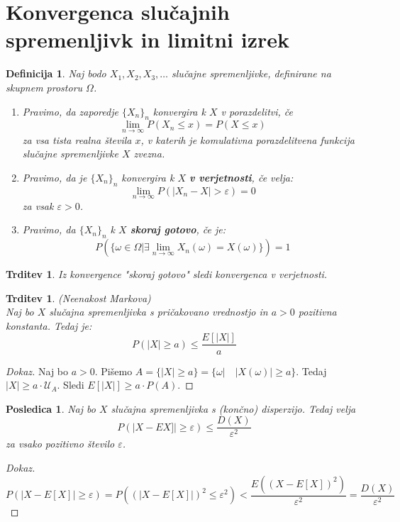 \documentclass[11pt]{article}
\newtheorem{Trditev}[Izrek]{{\sc Trditev}}
\newtheorem{Posledica}[Izrek]{{\sc Posledica}}
\newtheorem{Definicija}[Izrek]{{\sc Definicija}}
\newenvironment{dokaz}[1][{\sc Dokaz}]{\begin{proof}[#1]\renewcommand*{\qedsymbol}{\(\blacksquare\)}}{\end{proof}}
\begin{document}
	\section{Konvergenca slučajnih spremenljivk in limitni izrek}
	\begin{Definicija}
		Naj bodo $X_1,X_2,X_3,\ldots $ slučajne spremenljivke, definirane na skupnem prostoru $\Omega$.
		\begin{enumerate}
			\item
			Pravimo, da zaporedje $\{X_n\}_n$ konvergira k $X$ v porazdelitvi, če $$\lim\limits_{n \to \infty}{P(X_n \le x)} = P(X\le x)$$
			za vsa tista realna števila $x$, v katerih je komulativna porazdelitvena funkcija slučajne spremenljivke $X$ zvezna.
			\item
			Pravimo, da je $\{X_n\}_n$ konvergira k $X$ \textbf{v verjetnosti}, če velja:
			$$\lim\limits_{n \to \infty}{P(|X_n - X|>\varepsilon)} = 0$$
			za vsak $\varepsilon > 0$.
			\item
			Pravimo, da $\{X_n\}_n$ k $X$ \textbf{skoraj gotovo}, če je:
			$$P(\{\omega \in \Omega | \exists \lim\limits_{n \to \infty}{X_n(\omega) = X(\omega)}\}) = 1$$	
		\end{enumerate}
	\end{Definicija}
	\begin{Trditev}
		Iz konvergence "skoraj gotovo" sledi konvergenca v verjetnosti.
	\end{Trditev}
	\begin{Trditev}
		(Neenakost Markova)
		\\
		Naj bo $X$ slučajna spremenljivka s pričakovano vrednostjo in $a>0$ pozitivna konstanta. Tedaj je:
		$$P(|X| \ge a) \le \frac{E[|X|]}{a}$$
	\end{Trditev}
	\begin{dokaz}
		Naj bo $a>0$. Pišemo $A =  \{|X| \ge a\} = \{\omega |\quad |X(\omega)| \ge a  \}$. Tedaj $|X| \ge a \cdot \mathcal{U}_A$. Sledi $E[|X|] \ge a \cdot P(A)$.
	\end{dokaz}
	\begin{Posledica}
		Naj bo $X$ slučajna spremenljivka s (končno) disperzijo. Tedaj velja
		$$P(|X - EX]|\ge \varepsilon) \le \frac{D(X)}{\varepsilon ^2}$$
		za vsako pozitivno število $\varepsilon$.
	\end{Posledica}
	\begin{dokaz}
		$$P(|X- E[X]| \ge \varepsilon) = P( (|X - E[X]|)^2 \le \varepsilon ^2) < \frac{E((X - E[X])^2)}{\varepsilon ^2} = \frac{D(X)}{\varepsilon ^2}$$
	\end{dokaz}
\end{document}
